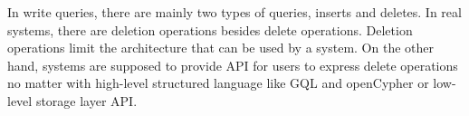 In write queries, there are mainly two types of queries, inserts and deletes. In
real systems, there are deletion operations besides delete operations. Deletion
operations limit the architecture that can be used by a system. On the other
hand, systems are supposed to provide API for users to express delete operations
no matter with high-level structured language like GQL and openCypher or
low-level storage layer API.














% 
% 